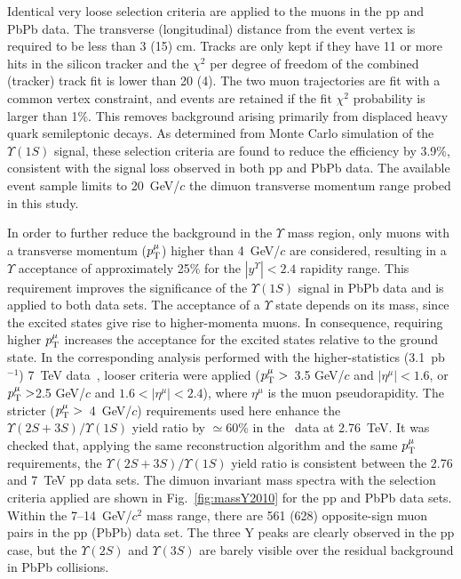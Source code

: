 Identical very loose selection criteria are applied to the muons in the pp and PbPb data. The transverse (longitudinal) distance from the event 
vertex is required to be less than 3 (15) cm. Tracks are only kept if they have 11 or more hits in the silicon tracker and the $\chi^2$ per degree 
of freedom of the combined (tracker) track fit is lower than 20 (4). The two muon trajectories are fit with a common vertex constraint, 
and events are retained if the fit $\chi^2$ probability is larger than 1$\%$. This removes background arising primarily from displaced heavy 
quark semileptonic decays. As determined from Monte Carlo simulation of the $\Upsilon(1S)$ signal, these selection criteria are found to 
reduce the efficiency by 3.9$\%$, consistent with the signal loss observed in both pp and PbPb data. The available event sample limits to 
20~GeV/$c$ the dimuon transverse momentum range probed in this study.

In order to further reduce the background in the $\Upsilon$ mass region, only muons with a transverse momentum ($p_{\rm T}^\mu$) higher than 
4~GeV/$c$ are considered, resulting in a $\Upsilon$ acceptance of approximately 25$\%$  for the $|y^\Upsilon|<2.4$ rapidity range. This 
requirement improves the significance of the $\Upsilon(1S)$ signal in PbPb data and is applied to both data sets. The acceptance of 
a $\Upsilon$ state depends on its mass, since the excited states give rise to higher-momenta muons. In consequence, requiring higher 
$p_{\rm T}^\mu$ increases the acceptance for the excited states relative to the ground state. 
In the corresponding analysis performed with the higher-statistics (3.1~pb$^{-1}$) 7~TeV data~\cite{Khachatryan:2010zg}, looser criteria were applied 
($p_{\rm T}^\mu >$~3.5 GeV/$c$ and $|\eta^\mu| < 1.6$, or $p_{\rm T}^\mu >$2.5 GeV/$c$ and $1.6 < |\eta^\mu| < 2.4$), where $\eta^\mu$ is the muon pseudorapidity. 
The stricter ($p_{\rm T}^\mu >$~4~GeV/$c$) requirements used here  enhance the  $\Upsilon(2S+3S)/\Upsilon(1S)$ yield ratio by $\simeq 60$\% in the \Pp\Pp\ data 
at 2.76~TeV. It was checked that, applying the same reconstruction algorithm and the same $p_{\rm T}^\mu$ requirements, the $\Upsilon(2S+3S)/\Upsilon(1S)$ yield 
ratio is consistent between the 2.76 and 7~TeV pp data sets.
The dimuon invariant mass spectra with the selection criteria applied are shown in Fig.~\ref{fig:massY2010} for the pp and PbPb data sets. Within the 7--14~GeV/$c^2$ 
mass range, there are 561 (628) opposite-sign muon pairs in the pp (PbPb) data set. The three Y peaks are clearly observed in the pp case, but the 
$\Upsilon(2S)$ and $\Upsilon(3S)$ are barely visible over the residual background in PbPb collisions.

